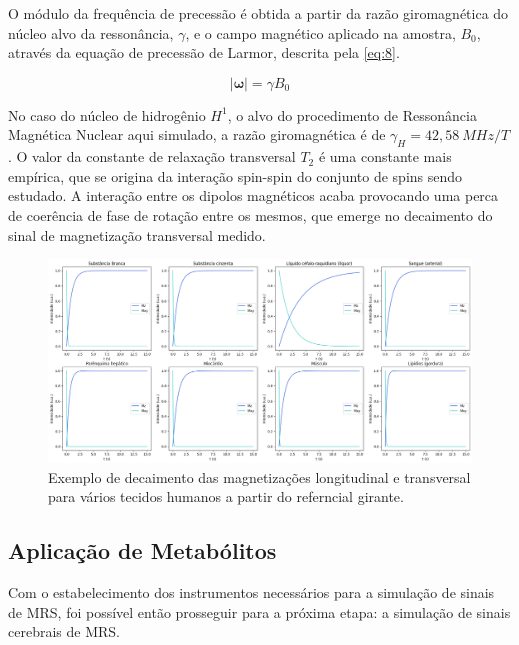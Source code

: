 \documentclass[
12pt,		
twoside, 
a4paper,
chapter=TITLE,
english,			
brazil]{USPSC-classe/USPSC}
\begin{document}
O módulo da frequência de precessão é obtida a partir da razão giromagnética do núcleo alvo da ressonância, $\gamma$, e o campo magnético aplicado na amostra, $B_0$, através 
da equação de precessão de Larmor, descrita pela \autoref{eq:8}.

\begin{equation} \label{eq:8}
    |\mathbf{\omega}| = \gamma B_0
\end{equation}

No caso do núcleo de hidrogênio $H^1$, o alvo do procedimento de Ressonância Magnética Nuclear aqui simulado, a razão giromagnética é de $\gamma_H = 42,58 \ MHz/T$. O valor da constante de relaxação transversal $T_2$ é 
uma constante mais empírica, que se origina da interação spin-spin do conjunto de spins sendo estudado. A interação entre os dipolos magnéticos acaba provocando uma perca de coerência de fase de rotação entre os mesmos, 
que emerge no decaimento do sinal de magnetização transversal medido.

\begin{figure}[H]
    \includegraphics[scale=0.25]{T2.png}
    \centering
    \caption{Exemplo de decaimento das magnetizações longitudinal e transversal para vários tecidos humanos a partir do referncial girante.}
    \label{fig:7}
\end{figure}

\subsection{Aplicação de Metabólitos}
\label{sec:metabolites}

Com o estabelecimento dos instrumentos necessários para a simulação de sinais de MRS, foi possível então prosseguir para a próxima etapa:
a simulação de sinais cerebrais de MRS.
\end{document}
